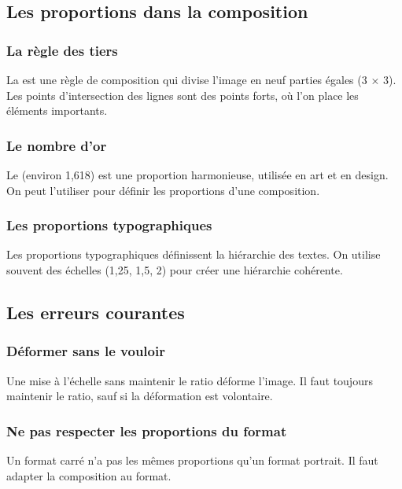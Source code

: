 \subsection{Les proportions dans la composition}

\subsubsection{La règle des tiers}

La  est une règle de composition qui divise l'image en neuf parties égales (3 × 3). Les points d'intersection des lignes sont des points forts, où l'on place les éléments importants.

\subsubsection{Le nombre d'or}

Le  (environ 1,618) est une proportion harmonieuse, utilisée en art et en design. On peut l'utiliser pour définir les proportions d'une composition.

\subsubsection{Les proportions typographiques}

Les proportions typographiques définissent la hiérarchie des textes. On utilise souvent des échelles (1,25, 1,5, 2) pour créer une hiérarchie cohérente.

\subsection{Les erreurs courantes}

\subsubsection{Déformer sans le vouloir}

Une mise à l'échelle sans maintenir le ratio déforme l'image. Il faut toujours maintenir le ratio, sauf si la déformation est volontaire.

\subsubsection{Ne pas respecter les proportions du format}

Un format carré n'a pas les mêmes proportions qu'un format portrait. Il faut adapter la composition au format.


